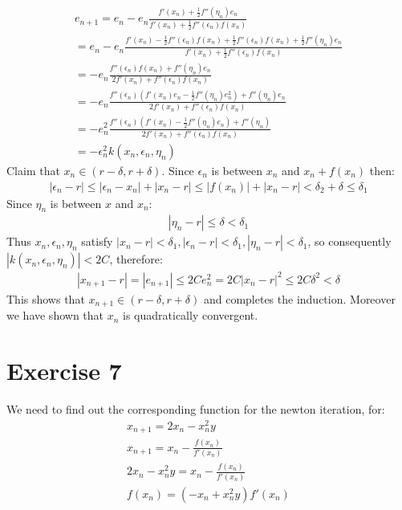 \begin{gather*}
e_{n+1} = e_n - e_n\frac{f'(x_n) + \frac{1}{2} f''(\eta_n) e_n}{f'(x_n) + \frac{1}{2} f''(\epsilon_n)f(x_n)}\\
= e_n - e_n\frac{f'(x_n) -\frac{1}{2}f''(\epsilon_n)f(x_n) + \frac{1}{2} f''(\epsilon_n)f(x_n) + \frac{1}{2} f''(\eta_n) e_n}{f'(x_n) + \frac{1}{2} f''(\epsilon_n)f(x_n)}\\
= -e_n \frac{f''(\epsilon_n) f(x_n) + f''(\eta_n) e_n}{2f'(x_n) + f''(\epsilon_n)f(x_n)}\\
= -e_n \frac{f''(\epsilon_n)(f'(x_n)e_n - \frac{1}{2} f''(\eta_n) e_n^2)+ f''(\eta_n)e_n}{2f'(x_n) + f''(\epsilon_n) f(x_n)}\\
=-e_n^2 \frac{f''(\epsilon_n)(f'(x_n) - \frac{1}{2} f''(\eta_n)e_n) + f''(\eta_n)}{2f'(x_n) + f''(\epsilon_n)f(x_n)}\\
= -\epsilon_n^2 k(x_n,\epsilon_n,\eta_n)
\end{gather*}
Claim that $x_n\in (r-\delta,r+\delta)$. Since $\epsilon_n$ is between $x_n$ and $x_n+ f(x_n)$ then:
\begin{gather*}
|\epsilon_n -r| \leq | \epsilon_n - x_n | + |x_n - r| \leq |f(x_n) | + |x_n-r| < \delta_2 + \delta \leq \delta_1
\end{gather*}
Since $\eta_n$ is between $x$ and $x_n$:
\begin{gather*}
|\eta_n -r| \leq \delta < \delta_1
\end{gather*}
Thus $x_n, \epsilon_n, \eta_n$ satisfy $|x_n-r| < \delta_1, | \epsilon_n -r| < \delta_1 , | \eta_n -r | < \delta_1$, so consequently $|k(x_n,\epsilon_n,\eta_n)| < 2C$, therefore:
\begin{gather*}
|x_{n+1} -r| = |e_{n+1}|	 \leq 2C e_n^2 = 2C |x_n -r|^2 \leq 2C\delta^2 < \delta
\end{gather*}
This shows that $x_{n+1} \in ( r-\delta,r+\delta)$ and completes the induction. Moreover we have shown that $x_n$ is quadratically convergent.
\section{Exercise 7}
We need to find out the corresponding function for the newton iteration, for:
\begin{gather*}
x_{n+1} = 2x_n - x_n^2 y\\
x_{n+1} = x_n - \frac{f(x_n)}{f'(x_n)}\\
2x_n - x_n^2 y = x_n - \frac{f(x_n)}{f'(x_n)}\\
f(x_n) = (-x_n + x_n^2y) f'(x_n)
\end{gather*}

